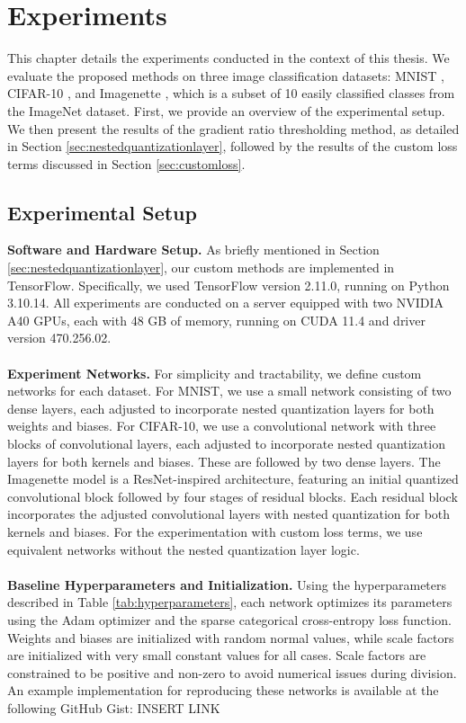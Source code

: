 \chapter{Experiments\label{cha:chapter4}}
This chapter details the experiments conducted in the context of this thesis.
We evaluate the proposed methods on three image classification datasets:
MNIST \cite{lecun2010mnist},
CIFAR-10 \cite{krizhevsky2009learning},
and Imagenette \cite{DBLP:journals/information/HowardG20}, which is a subset of 10 easily classified classes from the ImageNet dataset.
First, we provide an overview of the experimental setup.
We then present the results of the gradient ratio thresholding method, as detailed in Section \ref{sec:nestedquantizationlayer},
followed by the results of the custom loss terms discussed in Section \ref{sec:customloss}.


\section{Experimental Setup}
\label{sec:setup}
\textbf{Software and Hardware Setup.} As briefly mentioned in Section \ref{sec:nestedquantizationlayer},
our custom methods are implemented in TensorFlow.
Specifically, we used TensorFlow version 2.11.0, running on Python 3.10.14. 
All experiments are conducted on a server equipped with two NVIDIA A40 GPUs, 
each with 48 GB of memory, running on CUDA 11.4 and driver version 470.256.02.
\\
\\
\textbf{Experiment Networks.} 
For simplicity and tractability, we define custom networks for each dataset.
For MNIST, we use a small network consisting of two dense layers, 
each adjusted to incorporate nested quantization layers for both weights and biases. 
For CIFAR-10, we use a convolutional network with three blocks of convolutional layers, 
each adjusted to incorporate nested quantization layers for both kernels and biases.
These are followed by two dense layers.
The Imagenette model is a ResNet-inspired architecture,
featuring an initial quantized convolutional block followed by four stages of residual blocks. 
Each residual block incorporates the adjusted convolutional layers with nested quantization 
for both kernels and biases. For the experimentation with custom loss terms, 
we use equivalent networks without the nested quantization layer logic.
\\
\\
\textbf{Baseline Hyperparameters and Initialization.} Using the hyperparameters described in Table \ref{tab:hyperparameters}, 
each network optimizes its parameters using the Adam optimizer and the sparse categorical cross-entropy loss function. 
Weights and biases are initialized with random normal values, 
while scale factors are initialized with very small constant values for all cases. 
Scale factors are constrained to be positive and non-zero to avoid numerical issues during division. 
An example implementation for reproducing these networks is available at the following GitHub Gist: INSERT LINK

